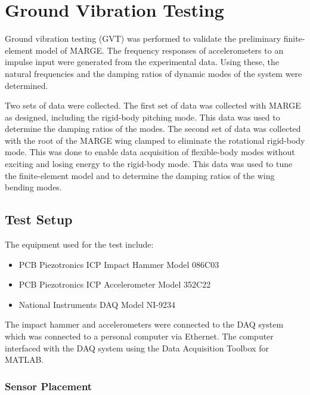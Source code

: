 \chapter{Ground Vibration Testing}
\label{ch:gvt}

Ground vibration testing (GVT) was performed to validate the preliminary finite-element model of MARGE. The frequency responses of accelerometers to an impulse input were generated from the experimental data. Using these, the natural frequencies and the damping ratios of dynamic modes of the system were determined.

Two sets of data were collected. The first set of data was collected with MARGE as designed, including the rigid-body pitching mode. This data was used to determine the damping ratios of the modes. The second set of data was collected with the root of the MARGE wing clamped to eliminate the rotational rigid-body mode. This was done to enable data acquisition of flexible-body modes without exciting and losing energy to the rigid-body mode. This data was used to tune the finite-element model and to determine the damping ratios of the wing bending modes.

\section{Test Setup} %

The equipment used for the test include:
\begin{itemize}
    \item PCB Piezotronics ICP Impact Hammer Model 086C03
    \item PCB Piezotronics ICP Accelerometer Model 352C22
    \item National Instruments DAQ Model NI-9234
\end{itemize}

The impact hammer and accelerometers were connected to the DAQ system which was connected to a personal computer via Ethernet. The computer interfaced with the DAQ system using the Data Acquisition Toolbox for MATLAB.

\subsection{Sensor Placement}

